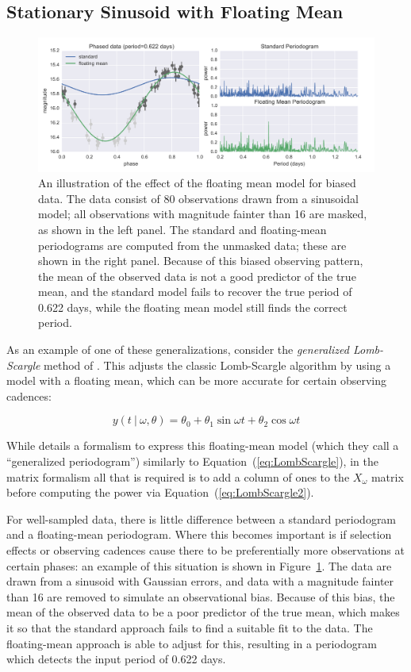 \documentclass[12pt,preprint]{aastex}
\newcommand{\Fig}[1]{Figure~\ref{fig:#1}}
\newcommand{\fig}[1]{\Fig{#1}}
\newcommand{\figlabel}[1]{\label{fig:#1}}
\newcommand{\Eq}[1]{Equation~(\ref{eq:#1})}
\newcommand{\eq}[1]{\Eq{#1}}
\newcommand{\sectlabel}[1]{\label{sect:#1}}
\begin{document}
\subsection{Stationary Sinusoid with Floating Mean}
\sectlabel{floating_mean}

\begin{figure}
  \centering
  \includegraphics[width=\textwidth]{fig02.pdf}
  \caption{
    An illustration of the effect of the floating mean model for biased data.
    The data consist of 80 observations drawn from a sinusoidal model; all observations with magnitude fainter than 16 are masked, as shown in the left panel. The standard and floating-mean periodograms are computed from the unmasked data; these are shown in the right panel. Because of this biased observing pattern, the mean of the observed data is not a good predictor of the true mean, and the standard model fails to recover the true period of 0.622 days, while the floating mean model still finds the correct period.
  }
  \figlabel{floating_mean}
\end{figure}

As an example of one of these generalizations, consider the {\it generalized Lomb-Scargle} method of \citet{Zechmeister09}. This adjusts the classic Lomb-Scargle algorithm by using a model with a floating mean, which can be more accurate for certain observing cadences:

\begin{equation}
  y(t~|~\omega, \theta) = \theta_0 + \theta_1\sin\omega t + \theta_2\cos\omega t
\end{equation}

While \citet{Zechmeister09} details a formalism to express this floating-mean model (which they call a ``generalized periodogram'') similarly to \eq{LombScargle}, in the matrix formalism all that is required is to add a column of ones to the $X_\omega$ matrix before computing the power via \eq{LombScargle2}.

For well-sampled data, there is little difference between a standard periodogram and a floating-mean periodogram. Where this becomes important is if selection effects or observing cadences cause there to be preferentially more observations at certain phases: an example of this situation is shown in \fig{floating_mean}. The data are drawn from a sinusoid with Gaussian errors, and data with a magnitude fainter than 16 are removed to simulate an observational bias. Because of this bias, the mean of the observed data to be a poor predictor of the true mean, which makes it so that the standard approach fails to find a suitable fit to the data. The floating-mean approach is able to adjust for this, resulting in a periodogram which detects the input period of 0.622 days.
\end{document}

